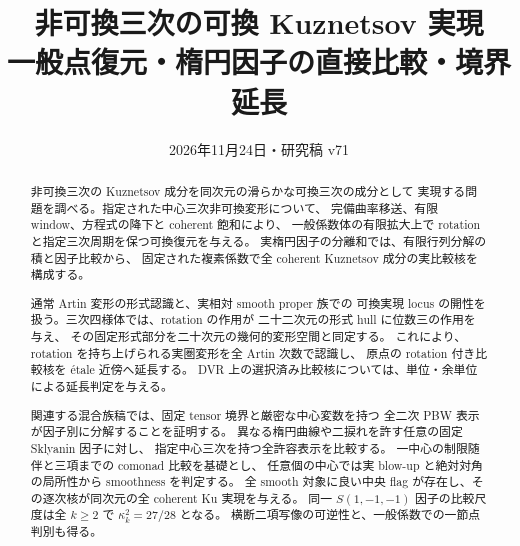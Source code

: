 
\title{非可換三次の可換 Kuznetsov 実現\\
\large 一般点復元・楕円因子の直接比較・境界延長}
\author{}
\date{2026年11月24日・研究稿 v71}

\maketitle
\begin{abstract}
非可換三次の Kuznetsov 成分を同次元の滑らかな可換三次の成分として
実現する問題を調べる。指定された中心三次非可換変形について、
完備曲率移送、有限 window、方程式の降下と coherent 飽和により、
一般係数体の有限拡大上で rotation と指定三次周期を保つ可換復元を与える。
実楕円因子の分離和では、有限行列分解の積と因子比較から、
固定された複素係数で全 coherent Kuznetsov 成分の実比較核を構成する。

通常 Artin 変形の形式認識と、実相対 smooth proper 族での
可換実現 locus の開性を扱う。三次四様体では、rotation の作用が
二十二次元の形式 hull に位数三の作用を与え、
その固定形式部分を二十次元の幾何的変形空間と同定する。
これにより、rotation を持ち上げられる実圏変形を全 Artin 次数で認識し、
原点の rotation 付き比較核を \'etale 近傍へ延長する。
DVR 上の選択済み比較核については、単位・余単位による延長判定を与える。

関連する混合族稿では、固定 tensor 境界と厳密な中心変数を持つ
全二次 PBW 表示が因子別に分解することを証明する。
異なる楕円曲線や二捩れを許す任意の固定 Sklyanin 因子に対し、
指定中心三次を持つ全許容表示を比較する。
一中心の制限随伴と三項までの comonad 比較を基礎とし、
任意個の中心では実 blow-up と絶対対角の局所性から smoothness を判定する。
全 smooth 対象に良い中央 flag が存在し、その逐次核が同次元の全 coherent Ku 実現を与える。
同一 $S(1,-1,-1)$ 因子の比較尺度は全 $k\ge2$ で $\kappa_k^2=27/28$ となる。
横断二項写像の可逆性と、一般係数での一節点判別も得る。


\end{abstract}
